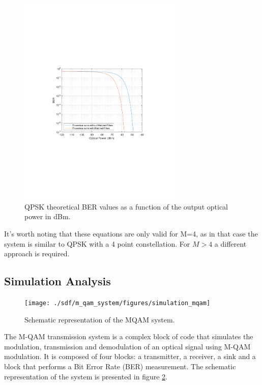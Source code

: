 \begin{figure}[h]
		\centering
		\includegraphics[clip, trim=4cm 8cm 4cm 8cm, width=0.7\textwidth]{./sdf/m_qam_system/figures/teor_BER_curves.pdf}
		\caption{QPSK theoretical BER values as a function of the output optical power in dBm.\label{fig:QPSK_th_curves}}	
\end{figure}


It's worth noting that these equations are only valid for M=4, as in that case the system is similar to QPSK with a 4 point constellation. For $M > 4$ a different approach is required.


\subsection{Simulation Analysis}

\begin{figure}[h]
	\centering
	\texttt{[image: ./sdf/m\_qam\_system/figures/simulation\_mqam]}
	\caption{Schematic representation of the MQAM system.}\label{MQAM_system_block_diagram}
\end{figure}

The M-QAM transmission system is a complex block of code that simulates the modulation, transmission and
demodulation of an optical signal using M-QAM modulation.
It is composed of four blocks: a transmitter, a receiver, a sink and a block that performs a Bit Error Rate (BER) measurement. The schematic representation of the
system is presented in figure \ref{MQAM_system_block_diagram}.
	
